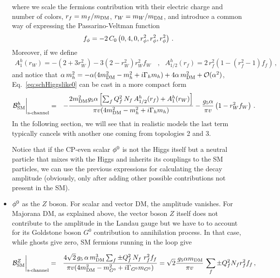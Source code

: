 \begin{itemize}
where we scale the fermions contribution with their electric charge and number of colors, $r_f=m_f/m_{\text{DM}}$, $r_W=m_W/m_{\text{DM}}$,  and  introduce a common way of expressing the Passarino-Veltman function
\begin{equation}
f_{\phi} = -2 \, C_0\left( 0, 4 , 0, r_\phi^2,  r_\phi^2,  r_\phi^2\right)\,.
\end{equation}
Moreover, if we define
\begin{align}
A^h_1(r_W) = -(2+3r_W^2)- 3(2-r_W^2)r_W^2 f_W & \,, & A^h_{1/2}(r_f) =  2\,r_f^2\left( 1-(r_f^2-1)f_f\right) \,,
\end{align}
and notice  that $\alpha\, m_h^2 = -\alpha(4m_{\text{DM}}^2-m_h^2+i\Gamma_h m_h)+  4\alpha\, m_{\text{DM}}^2+ {\cal O}(\alpha^2)$, Eq.~\eqref{eq:schHiggslike0} can be cast in a more compact form
\begin{eqnarray}
{\cal B}^h_\text{SM}\bigg|_\text{s-channel} &=&-\frac{2 m_{\text{DM}}^2g_5 \alpha \left[ \sum_f  Q_f^2\, N_f\,  A^h_{1/2}(r_f) + A^h_1(r_W)  \right]}{\pi v(4m_{\text{DM}}^2-m_h^2+i\Gamma_h m_h)}   - \frac{g_5 \alpha}{\pi v} \left( 1-r_W^2 f_W\right)\,.
\label{eq:schHiggslike}
\end{eqnarray}
In the following section, we will see that in realistic models the last term typically cancels with another one coming from topologies 2 and 3. 


Notice that  if the CP-even scalar ${\phi^0}$ is not the Higgs itself  but a neutral particle that mixes with the Higgs and inherits its couplings to the SM particles, we can use the previous expressions for calculating the decay amplitude (obviously, only after adding other possible contributions not present in the SM). 


\item ${\phi^0}$ as the $Z$ boson. For scalar and vector DM, the amplitude vanishes. For Majorana DM, as explained above, the vector boson $Z$ itself does not contribute to the amplitude in the Landau gauge but we have to to account for its Goldstone boson $G^0$ contribution to annihilation process. In that case, while  ghosts give zero, SM fermions running in the loop give  

\begin{eqnarray}
{\cal B}_\text{SM}^Z\bigg|_\text{s-channel} &=& \frac{4\sqrt{2}\,g_5\,\alpha\,m_{\text{DM}}^3  \sum_f \pm Q_f^2\, N_f\   r_f^2 f_f  }{\pi v(4m_{\text{DM}}^2-m_{G^0}^2+i\Gamma_{G^0} m_{G^0})} =\sqrt{2}\frac{\,g_5\alpha m_{\text{DM}}}{\pi v}\,  \sum_f \pm Q_f^2  N_f r_f^2 f_f  \,,
\label{eq:schZ}
\end{eqnarray}
\end{itemize}


